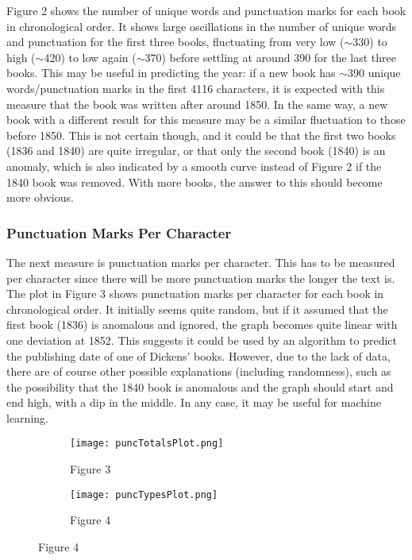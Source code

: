 \documentclass[11pt,a4paper,reqno]{amsart}
\begin{document}
Figure 2 shows the number of unique words and punctuation marks for each book in chronological order. It shows large oscillations in the number of unique words and punctuation for the first three books, fluctuating from very low ($\sim$330) to high ($\sim$420) to low again ($\sim$370) before settling at around 390 for the last three books. This may be useful in predicting the year: if a new book has $\sim$390 unique words/punctuation marks in the first 4116 characters, it is expected with this measure that the book was written after around 1850. In the same way, a new book with a different result for this measure may be a similar fluctuation to those before 1850. This is not certain though, and it could be that the first two books (1836 and 1840) are quite irregular, or that only the second book (1840) is an anomaly, which is also indicated by a smooth curve instead of Figure 2 if the 1840 book was removed. With more books, the answer to this should become more obvious.

\subsubsection{Punctuation Marks Per Character}
The next measure is punctuation marks per character. This has to be measured per character since there will be more punctuation marks the longer the text is. The plot in Figure 3 shows punctuation marks per character for each book in chronological order. It initially seems quite random, but if it assumed that the first book (1836) is anomalous and ignored, the graph becomes quite linear with one deviation at 1852. This suggests it could be used by an algorithm to predict the publishing date of one of Dickens' books. However, due to the lack of data, there are of course other possible explanations (including randomness), such as the possibility that the 1840 book is anomalous and the graph should start and end high, with a dip in the middle. In any case, it may be useful for machine learning. 

\begin{figure}[!h]
\centering
\begin{subfigure}{.5\textwidth}
  \centering
  \texttt{[image: puncTotalsPlot.png]}
  \caption*{Figure 3}
\end{subfigure}%
\begin{subfigure}{.5\textwidth}
  \centering
  \texttt{[image: puncTypesPlot.png]}
  \caption*{Figure 4}
\end{subfigure}
\end{figure}
\end{document}
